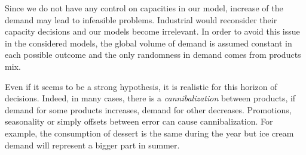 Since we do not have any control on capacities in our model, increase of the demand may lead to infeasible problems.
Industrial would reconsider their capacity decisions and our models become irrelevant.
In order to avoid this issue in the considered models, the global volume of demand is assumed constant in each possible outcome and the only randomness in demand comes from products mix.


Even if it seems to be a strong hypothesis, it is realistic for this horizon of decisions.
Indeed, in many cases, there is a \emph{cannibalization} between products, \ie if demand for some products increases, demand for other decreases.
Promotions, seasonality or simply offsets between error can cause cannibalization.
For example, the consumption of dessert is the same during the year but ice cream demand will represent a bigger part in summer.


